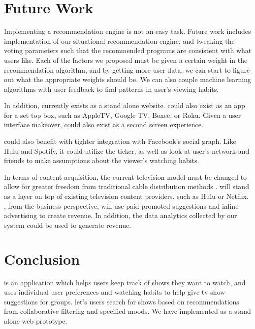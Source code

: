 \section{Future Work}
Implementing a recommendation engine is not an easy task.  Future work
includes implementation of our situational recommendation engine, and
tweaking the voting parameters such that the recommended programs are
consistent with what users like.  Each of the factors we proposed must
be given a certain weight in the recommendation algorithm, and by
getting more user data, we can start to figure out what the
appropriate weights should be.  We can also couple machine learning
algorithms with user feedback to find patterns in user’s viewing
habits.

In addition, {\sys} currently exists as a stand alone website.  {\sys}
could also exist as an app for a set top box, such as AppleTV, Google
TV, Boxee, or Roku.  Given a user interface makeover, {\sys} could
also exist as a second screen experience.

{\sys} could also benefit with tighter integration with Facebook’s
social graph.  Like Hulu and Spotify, it could utilize the ticker, as
well as look at user’s network and friends to make assumptions about
the viewer’s watching habits.

In terms of content acquisition, the current television model must be
changed to allow for greater freedom from traditional cable
distribution methods \cite{montpetit}.  {\sys} will stand as a layer
on top of existing television content providers, such as Hulu or
Netflix.  {\sys}, from the business perspective, will use paid
promoted suggestions and inline advertising to create revenue.  In
addition, the data analytics collected by our system could be used to
generate revenue.

\section{Conclusion}

{\sys} is an application which helps users keep track of shows they
want to watch, and uses individual user preferences and watching
habits to help give tv show suggestions for groups.  {\sys} let's
users search for shows based on recommendations from collaborative
filtering and specified moods.  We have implemented {\sys} as a stand
alone web prototype.

